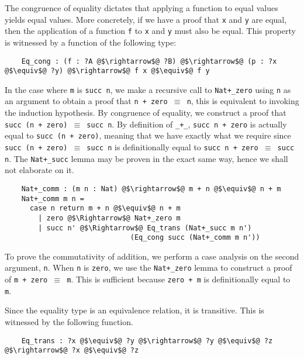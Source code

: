\documentclass[12pt,twoside,maitrise]{dms}
\theoremstyle{definition}
\numberwithin{equation}{section}
\numberwithin{table}{chapter}
\numberwithin{figure}{chapter}
\newcommand\id[1] {\texttt{#1}}
\newcommand\fn[1] {\texttt{#1}}
\begin{document}
The congruence of equality dictates that applying a function to equal values
yields equal values. More concretely, if we have a proof that \id{x} and \id{y}
are equal, then the application of a function \id{f} to \id{x} and \id{y} must
also be equal. This property is witnessed by a function of the following type:

\begin{verbatim}
    Eq_cong : (f : ?A @$\rightarrow$@ ?B) @$\rightarrow$@ (p : ?x @$\equiv$@ ?y) @$\rightarrow$@ f x @$\equiv$@ f y
\end{verbatim}

In the case where \id{m} is \fn{succ n}, we make a recursive call to
\id{Nat+\_zero} using \id{n} as an argument to obtain a proof that \fn{n + zero
  $\equiv$ n}, this is equivalent to invoking the induction hypothesis. By
congruence of equality, we construct a proof that \fn{succ (n + zero) $\equiv$
  succ n}. By definition of \id{\_+\_}, \fn{succ n + zero} is actually equal to
\fn{succ (n + zero)}, meaning that we have exactly what we require since
\fn{succ (n + zero) $\equiv$ succ n} is definitionally equal to \fn{succ n +
  zero $\equiv$ succ n}. The \id{Nat+\_succ} lemma may be proven in the exact
same way, hence we shall not elaborate on it.

\begin{verbatim}
    Nat+_comm : (m n : Nat) @$\rightarrow$@ m + n @$\equiv$@ n + m
    Nat+_comm m n =
      case n return m + n @$\equiv$@ n + m
        | zero @$\Rightarrow$@ Nat+_zero m
        | succ n' @$\Rightarrow$@ Eq_trans (Nat+_succ m n')
                              (Eq_cong succ (Nat+_comm m n'))
\end{verbatim}

To prove the commutativity of addition, we perform a case analysis on the second
argument, \id{n}. When \id{n} is \id{zero}, we use the \id{Nat+\_zero} lemma to
construct a proof of \fn{m + zero $\equiv$ m}. This is sufficient because
\fn{zero + m} is definitionally equal to \id{m}.

Since the equality type is an equivalence relation, it is transitive. This is
witnessed by the following function.

\begin{verbatim}
    Eq_trans : ?x @$\equiv$@ ?y @$\rightarrow$@ ?y @$\equiv$@ ?z @$\rightarrow$@ ?x @$\equiv$@ ?z
\end{verbatim}
\end{document}

